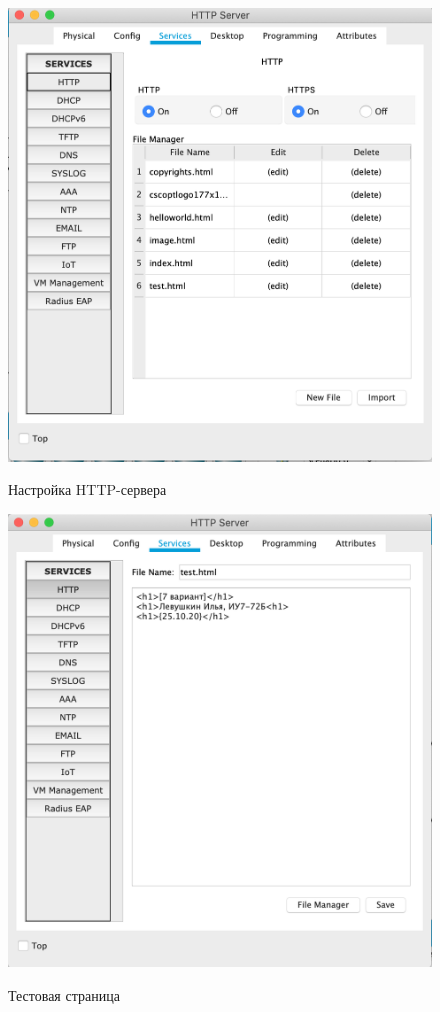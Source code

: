 \documentclass[a4paper,12pt]{article}
\begin{document}
	\begin{figure}[h!]
		\begin{center}
			{\includegraphics[scale = 0.45]{11.png}}
			\label{ris:11}
		\end{center}
		\caption{Настройка HTTP-сервера}
	\end{figure}

	\begin{figure}[h!]
		\begin{center}
			{\includegraphics[scale = 0.45]{12.png}}
			\label{ris:12}
		\end{center}
		\caption{Тестовая страница}
	\end{figure}
\end{document}

